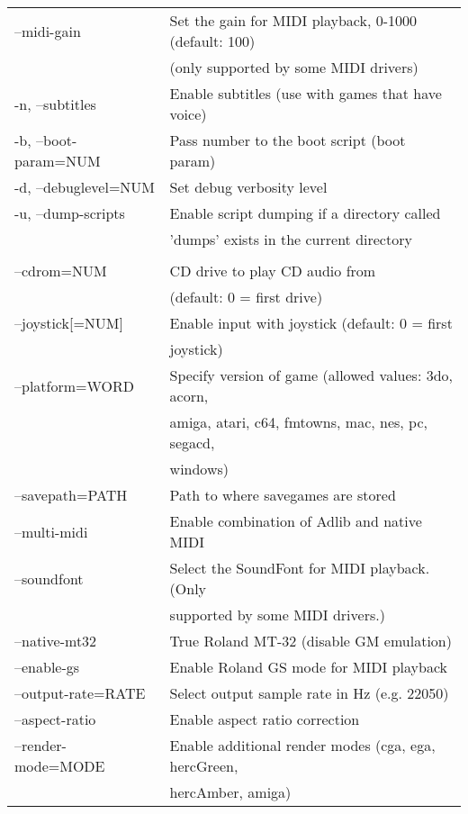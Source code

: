 \begin{tabular}{ll}
  --midi-gain             &Set the gain for MIDI playback, 0-1000 (default: 100)\\
                          &(only supported by some MIDI drivers)\\
  -n, --subtitles         &Enable subtitles (use with games that have voice)\\
  -b, --boot-param=NUM    &Pass number to the boot script (boot param)\\
  -d, --debuglevel=NUM    &Set debug verbosity level\\
  -u, --dump-scripts      &Enable script dumping if a directory called\\
                          &'dumps' exists in the current directory\\
\\
  --cdrom=NUM             &CD drive to play CD audio from\\
                          &(default: 0 = first drive)\\
  --joystick[=NUM]        &Enable input with joystick (default: 0 = first\\
                          &joystick)\\
  --platform=WORD         &Specify version of game (allowed values: 3do, acorn,\\
                          &amiga, atari, c64, fmtowns, mac, nes, pc, segacd,\\
                          &windows)\\
  --savepath=PATH         &Path to where savegames are stored\\
  --multi-midi            &Enable combination of Adlib and native MIDI\\
  --soundfont             &Select the SoundFont for MIDI playback. (Only\\
                          &supported by some MIDI drivers.)\\
  --native-mt32           &True Roland MT-32 (disable GM emulation)\\
  --enable-gs             &Enable Roland GS mode for MIDI playback\\
  --output-rate=RATE      &Select output sample rate in Hz (e.g. 22050)\\
  --aspect-ratio          &Enable aspect ratio correction\\
  --render-mode=MODE      &Enable additional render modes (cga, ega, hercGreen,\\
                          &hercAmber, amiga)\\

\end{tabular}
